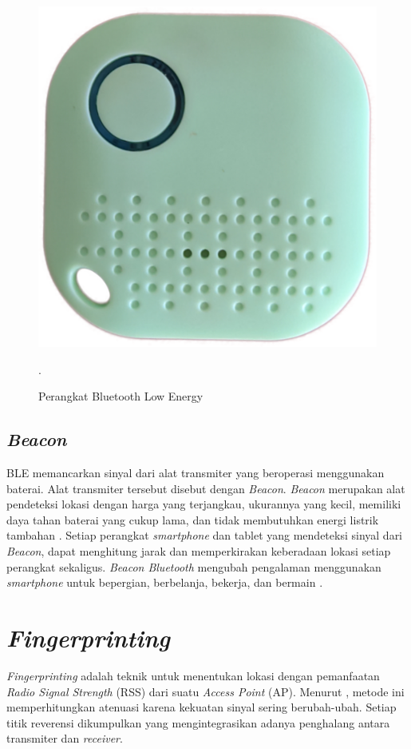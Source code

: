 \begin{figure}[H]
\centering
{\includegraphics [scale= .1]{gambar/bab2/BLE_Device}}
\caption{Perangkat Bluetooth Low Energy}.
\label{img:BLE_device}
\end{figure}

\subsection{\textit{Beacon}}
BLE memancarkan sinyal dari alat transmiter yang beroperasi menggunakan baterai. Alat transmiter tersebut disebut dengan \textit{Beacon}. \textit{Beacon} merupakan alat pendeteksi lokasi dengan harga yang terjangkau, ukurannya yang kecil, memiliki daya tahan baterai yang cukup lama, dan tidak membutuhkan energi listrik tambahan \citep{puspitasari2020}. Setiap perangkat \textit{smartphone} dan tablet yang mendeteksi sinyal dari \textit{Beacon}, dapat menghitung jarak dan memperkirakan keberadaan lokasi setiap perangkat sekaligus. \textit{Beacon Bluetooth} mengubah pengalaman menggunakan \textit{smartphone} untuk bepergian, berbelanja, bekerja, dan bermain \citep{kaluvza2017analysis}.

\section{\textit{Fingerprinting}}
\textit{Fingerprinting} adalah teknik untuk menentukan lokasi dengan pemanfaatan \textit{Radio Signal Strength} (RSS) dari suatu \textit{Access Point }(AP). Menurut \citep{yudha2018indoor} , metode ini memperhitungkan atenuasi karena kekuatan sinyal sering berubah-ubah. Setiap titik reverensi dikumpulkan yang mengintegrasikan adanya penghalang antara transmiter dan \textit{receiver}.


